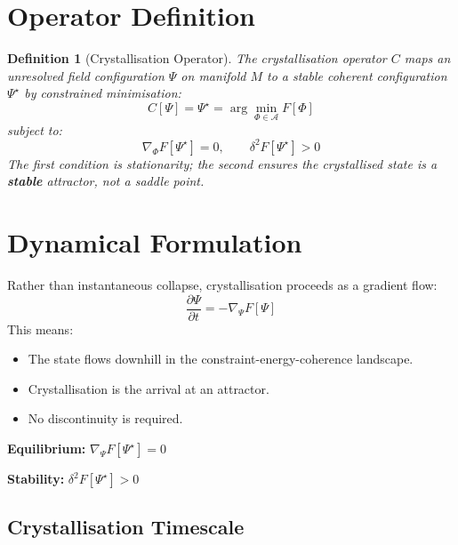 \documentclass[12pt]{article}
\newtheorem{definition}[theorem]{Definition}
\begin{document}
\section{Operator Definition}

\begin{definition}[Crystallisation Operator]
The crystallisation operator $C$ maps an unresolved field configuration $\Psi$ on manifold $M$ to a stable coherent configuration $\Psi^{\star}$ by constrained minimisation:
\begin{equation}
C[\Psi] = \Psi^{\star} = \arg\min_{\Phi \in \mathcal{A}} F[\Phi]
\end{equation}
subject to:
\begin{equation}
\nabla_\Phi F[\Psi^{\star}] = 0, \qquad \delta^2 F[\Psi^{\star}] > 0
\end{equation}
The first condition is stationarity; the second ensures the crystallised state is a \textbf{stable} attractor, not a saddle point.
\end{definition}

\section{Dynamical Formulation}

Rather than instantaneous collapse, crystallisation proceeds as a gradient flow:
\begin{equation}
\frac{\partial \Psi}{\partial t} = -\nabla_\Psi F[\Psi]
\end{equation}
This means:
\begin{itemize}
    \item The state flows downhill in the constraint-energy-coherence landscape.
    \item Crystallisation is the arrival at an attractor.
    \item No discontinuity is required.
\end{itemize}

\textbf{Equilibrium:} $\nabla_\Psi F[\Psi^{\star}] = 0$

\textbf{Stability:} $\delta^2 F[\Psi^{\star}] > 0$

\subsection{Crystallisation Timescale}
\end{document}
